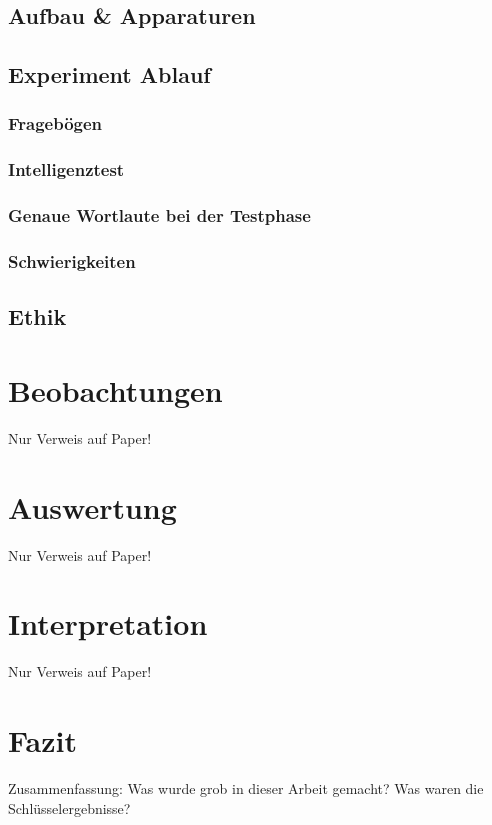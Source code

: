 \documentclass{Bericht}
\begin{document}
	\subsection{Aufbau \& Apparaturen}
	\subsection{Experiment Ablauf}
	\subsubsection{Fragebögen}
	\subsubsection{Intelligenztest}
	\subsubsection{Genaue Wortlaute bei der Testphase}
	\subsubsection{Schwierigkeiten}
	\subsection{Ethik}

\section{Beobachtungen}
	Nur Verweis auf Paper!

\section{Auswertung}
	Nur Verweis auf Paper!

\section{Interpretation}
	Nur Verweis auf Paper!
	
\section{Fazit}

	Zusammenfassung: Was wurde grob in dieser Arbeit gemacht? Was waren die Schlüsselergebnisse?
\end{document}
